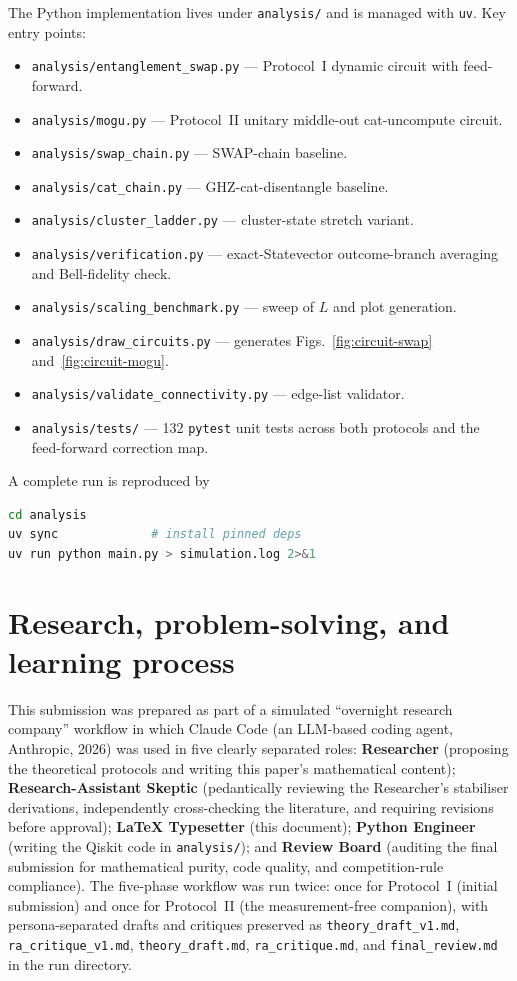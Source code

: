 \documentclass[11pt,a4paper]{article}
\theoremstyle{definition}
\begin{document}
The Python implementation lives under \texttt{analysis/} and is managed
with \texttt{uv}. Key entry points:
\begin{itemize}
\item \texttt{analysis/entanglement\_swap.py} — Protocol~I dynamic
  circuit with feed-forward.
\item \texttt{analysis/mogu.py} — Protocol~II unitary middle-out
  cat-uncompute circuit.
\item \texttt{analysis/swap\_chain.py} — SWAP-chain baseline.
\item \texttt{analysis/cat\_chain.py} — GHZ-cat-disentangle baseline.
\item \texttt{analysis/cluster\_ladder.py} — cluster-state stretch
  variant.
\item \texttt{analysis/verification.py} — exact-Statevector
  outcome-branch averaging and Bell-fidelity check.
\item \texttt{analysis/scaling\_benchmark.py} — sweep of $L$ and plot
  generation.
\item \texttt{analysis/draw\_circuits.py} — generates
  Figs.~\ref{fig:circuit-swap} and~\ref{fig:circuit-mogu}.
\item \texttt{analysis/validate\_connectivity.py} — edge-list validator.
\item \texttt{analysis/tests/} — 132 \texttt{pytest} unit tests across
  both protocols and the feed-forward correction map.
\end{itemize}
A complete run is reproduced by
\begin{lstlisting}[language=bash]
cd analysis
uv sync             # install pinned deps
uv run python main.py > simulation.log 2>&1
\end{lstlisting}

\section{Research, problem-solving, and learning process}
\label{sec:process}

This submission was prepared as part of a simulated ``overnight research
company'' workflow in which Claude Code (an LLM-based coding agent,
Anthropic, 2026) was used in five clearly separated roles:
\textbf{Researcher} (proposing the theoretical protocols and writing
this paper's mathematical content); \textbf{Research-Assistant
Skeptic} (pedantically reviewing the Researcher's stabiliser
derivations, independently cross-checking the literature, and requiring
revisions before approval); \textbf{LaTeX Typesetter} (this document);
\textbf{Python Engineer} (writing the Qiskit code in
\texttt{analysis/}); and \textbf{Review Board} (auditing the final
submission for mathematical purity, code quality, and competition-rule
compliance). The five-phase workflow was run twice: once for
Protocol~I (initial submission) and once for Protocol~II (the
measurement-free companion), with persona-separated drafts and
critiques preserved as \texttt{theory\_draft\_v1.md},
\texttt{ra\_critique\_v1.md}, \texttt{theory\_draft.md},
\texttt{ra\_critique.md}, and \texttt{final\_review.md} in the run
directory.
\end{document}
